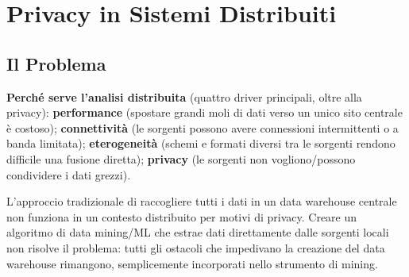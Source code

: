 \documentclass[a4paper,11pt]{article}
\begin{document}
\section{Privacy in Sistemi Distribuiti}

\subsection{Il Problema}

\textbf{Perch\'{e} serve l'analisi distribuita} (quattro driver principali, oltre alla privacy): \textbf{performance} (spostare grandi moli di dati verso un unico sito centrale \`{e} costoso); \textbf{connettivit\`{a}} (le sorgenti possono avere connessioni intermittenti o a banda limitata); \textbf{eterogeneit\`{a}} (schemi e formati diversi tra le sorgenti rendono difficile una fusione diretta); \textbf{privacy} (le sorgenti non vogliono/possono condividere i dati grezzi).

L'approccio tradizionale di raccogliere tutti i dati in un data warehouse centrale non funziona in un contesto distribuito per motivi di privacy. Creare un algoritmo di data mining/ML che estrae dati direttamente dalle sorgenti locali non risolve il problema: tutti gli ostacoli che impedivano la creazione del data warehouse rimangono, semplicemente incorporati nello strumento di mining.
\end{document}
